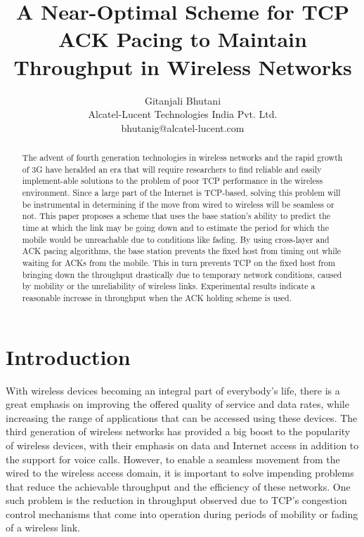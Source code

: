 \documentclass[conference]{IEEEtran}
\author{Gitanjali Bhutani\\Alcatel-Lucent Technologies India Pvt. Ltd.\\ bhutanig@alcatel-lucent.com}
\title{A Near-Optimal Scheme for TCP ACK Pacing to Maintain Throughput in Wireless Networks}
\date{}
\begin{document}
\maketitle
\begin{abstract}
  The advent of fourth generation technologies in wireless networks and the rapid growth of 3G have heralded an era that will require researchers to find reliable and easily implement-able solutions to the problem of poor TCP performance in the wireless environment. Since a large part of the Internet is TCP-based, solving this problem will be instrumental in determining if the move from wired to wireless will be seamless or not. This paper proposes a scheme that uses the base station's ability to predict the time at which the link may be going down and to estimate the period for which the mobile would be unreachable due to conditions like fading. By using cross-layer and ACK pacing algorithms, the base station prevents the fixed host from timing out while waiting for ACKs from the mobile. This in turn prevents TCP on the fixed host from bringing down the throughput drastically due to temporary network conditions, caused by mobility or the unreliability of wireless links. Experimental results indicate a reasonable increase in throughput when the ACK holding scheme is used.
\end{abstract}

\section{Introduction}
\label{sec:introduction}
With wireless devices becoming an integral part of everybody's life, there is a great emphasis on improving the offered quality of service and data rates, while increasing the range of applications that can be accessed using these devices. The third generation of wireless networks has provided a big boost to the popularity of wireless devices, with their emphasis on data and Internet access in addition to the support for voice calls. However, to enable a seamless movement from the wired to the wireless access domain, it is important to solve impending problems that reduce the achievable throughput and the efficiency of these networks. One such problem is the reduction in throughput observed due to TCP's congestion control mechanisms that come into operation during periods of mobility or fading of a wireless link.
\end{document}
